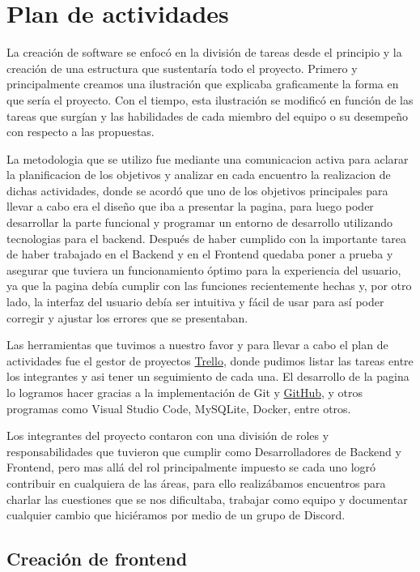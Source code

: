 \section{Plan de actividades}

La creación de software se enfocó en la división de tareas desde el principio y la creación de una estructura que sustentaría todo el proyecto. Primero y principalmente creamos una ilustración que explicaba graficamente la forma en que sería el proyecto. Con el tiempo, esta ilustración se modificó en función de las tareas que surgían y las habilidades de cada miembro del equipo o su desempeño con respecto a las propuestas. 

La metodologia que se utilizo fue mediante una comunicacion activa para aclarar la planificacion de los objetivos y analizar en cada encuentro la realizacion de dichas actividades, donde se acordó que uno de los objetivos principales para llevar a cabo era el diseño que iba a presentar la pagina, para luego poder desarrollar la parte funcional y programar un entorno de desarrollo utilizando tecnologias para el backend. Después de haber cumplido con la importante tarea de haber trabajado en el Backend y en el Frontend quedaba poner a prueba y asegurar que tuviera un funcionamiento óptimo para la experiencia del usuario, ya que la pagina debía cumplir con las funciones recientemente hechas y, por otro lado, la interfaz del usuario debía ser intuitiva y fácil de usar para así poder corregir y ajustar los errores que se presentaban.

Las herramientas que tuvimos a nuestro favor y para llevar a cabo el plan de actividades fue el gestor de proyectos \href{https://trello.com/b/gpuunRxX/tp-ids}{Trello}, donde pudimos listar las tareas entre los integrantes y asi tener un seguimiento de cada una. El desarrollo de la pagina lo logramos hacer gracias a la implementación de Git y \href{https://github.com/MaxiFttInst/UBA_TP_IDS}{GitHub}, y otros programas como Visual Studio Code, MySQLite, Docker, entre otros.

Los integrantes del proyecto contaron con una división de roles y responsabilidades que tuvieron que cumplir como Desarrolladores de Backend y Frontend, pero mas allá del rol principalmente impuesto se cada uno logró contribuir en cualquiera de las áreas, para ello realizábamos encuentros para charlar las cuestiones que se nos dificultaba, trabajar como equipo y documentar cualquier cambio que hiciéramos por medio de un grupo de Discord.

\subsection{Creación de frontend}

